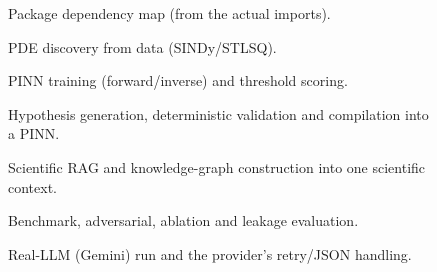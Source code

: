 \documentclass[11pt,a4paper]{article}
\begin{document}
\begin{figure}[!htb]\centering
\caption{Package dependency map (from the actual imports).}\end{figure}

\begin{figure}[!htb]\centering\pkglegend
\caption{PDE discovery from data (SINDy/STLSQ).}\end{figure}

\begin{figure}[!htb]\centering\pkglegend
\caption{PINN training (forward/inverse) and threshold scoring.}\end{figure}

\begin{figure}[!htb]\centering\pkglegend
\caption{Hypothesis generation, deterministic validation and compilation into a PINN.}\end{figure}

\begin{figure}[!htb]\centering\pkglegend
\caption{Scientific RAG and knowledge-graph construction into one scientific context.}\end{figure}

\begin{figure}[!htb]\centering\pkglegend
\caption{Benchmark, adversarial, ablation and leakage evaluation.}\end{figure}

\begin{figure}[!htb]\centering\pkglegend
\caption{Real-LLM (Gemini) run and the provider's retry/JSON handling.}\end{figure}
\end{document}
